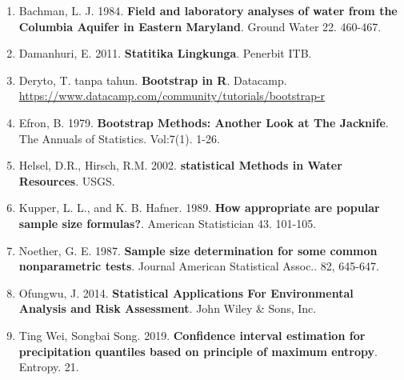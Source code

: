 \documentclass[]{book}
\providecommand{\tightlist}{%
  \setlength{\itemsep}{0pt}\setlength{\parskip}{0pt}}
\begin{document}
\begin{enumerate}
\def\labelenumi{\arabic{enumi}.}
\tightlist
\item
  Bachman, L. J. 1984. \textbf{Field and laboratory analyses of water
  from the Columbia Aquifer in Eastern Maryland}. Ground Water 22.
  460-467.
\item
  Damanhuri, E. 2011. \textbf{Statitika Lingkunga}. Penerbit ITB.
\item
  Deryto, T. tanpa tahun. \textbf{Bootstrap in R}. Datacamp.
  \url{https://www.datacamp.com/community/tutorials/bootstrap-r}
\item
  Efron, B. 1979. \textbf{Bootstrap Methods: Another Look at The
  Jacknife}. The Annuals of Statistics. Vol:7(1). 1-26.
\item
  Helsel, D.R., Hirsch, R.M. 2002. \textbf{statistical Methods in Water
  Resources}. USGS.
\item
  Kupper, L. L., and K. B. Hafner. 1989. \textbf{How appropriate are
  popular sample size formulas?}. American Statistician 43. 101-105.
\item
  Noether, G. E. 1987. \textbf{Sample size determination for some common
  nonparametric tests}. Journal American Statistical Assoc.. 82,
  645-647.
\item
  Ofungwu, J. 2014. \textbf{Statistical Applications For Environmental
  Analysis and Risk Assessment}. John Wiley \& Sons, Inc.
\item
  Ting Wei, Songbai Song. 2019. \textbf{Confidence interval estimation
  for precipitation quantiles based on principle of maximum entropy}.
  Entropy. 21.
\end{enumerate}


\end{document}
